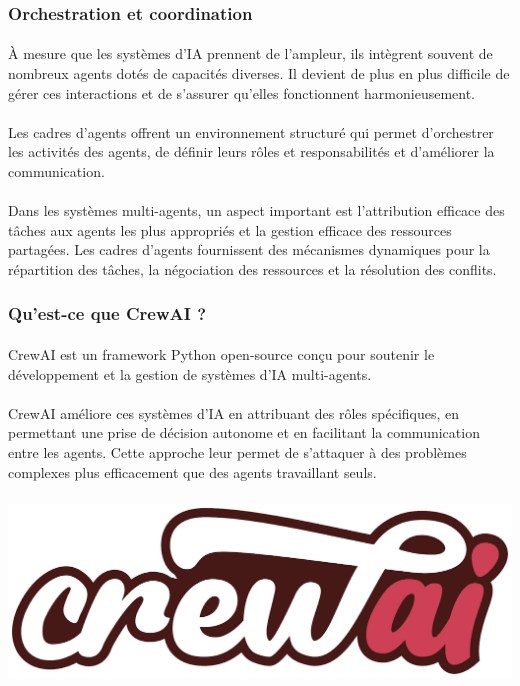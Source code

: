 \subsubsection{Orchestration et coordination }

\paragraph{}
À mesure que les systèmes d'IA prennent de l'ampleur, ils intègrent souvent de nombreux agents dotés de capacités diverses. Il devient de plus en plus difficile de gérer ces interactions et de s'assurer qu'elles fonctionnent harmonieusement.

\paragraph{}
Les cadres d'agents offrent un environnement structuré qui permet d'orchestrer les activités des agents, de définir leurs rôles et responsabilités et d'améliorer la communication.
\paragraph{}
Dans les systèmes multi-agents, un aspect important est l'attribution efficace des tâches aux agents les plus appropriés et la gestion efficace des ressources partagées. Les cadres d'agents fournissent des mécanismes dynamiques pour la répartition des tâches, la négociation des ressources et la résolution des conflits.

\subsubsection{Qu'est-ce que CrewAI ? }
\paragraph{}
CrewAI est un framework Python open-source conçu pour soutenir le développement et la gestion de systèmes d'IA multi-agents.
\paragraph{}
CrewAI améliore ces systèmes d'IA en attribuant des rôles spécifiques, en permettant une prise de décision autonome et en facilitant la communication entre les agents. Cette approche leur permet de s'attaquer à des problèmes complexes plus efficacement que des agents travaillant seuls.

\includegraphics[width=\linewidth, height=5cm]{images/crewai.png}
 
